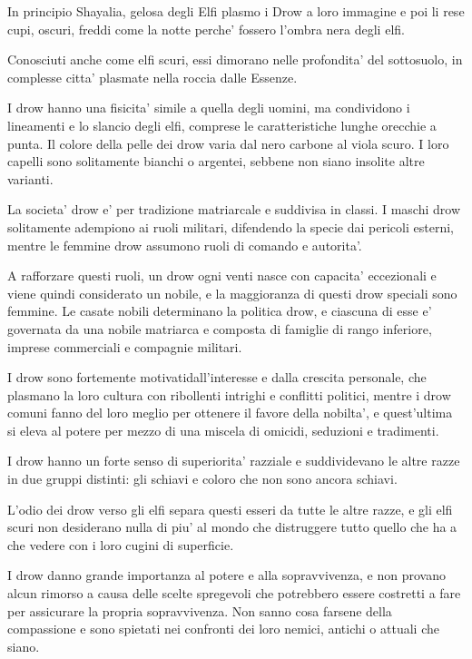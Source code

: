\documentclass[a4paper,11pt,twoside,openany]{dndbook}
\begin{document}
In principio Shayalia, gelosa degli Elfi plasmo i Drow a loro immagine e poi li rese cupi, oscuri, freddi come la notte perche' fossero l'ombra nera degli elfi.

Conosciuti anche come elfi scuri, essi dimorano nelle profondita' del sottosuolo, in complesse citta' plasmate nella roccia dalle Essenze.

I drow hanno una fisicita' simile a quella degli uomini, ma condividono i lineamenti e lo slancio degli elfi, comprese le caratteristiche lunghe orecchie a punta. Il colore della pelle dei drow varia dal nero carbone al viola scuro. I loro capelli sono solitamente bianchi o argentei, sebbene non siano insolite altre varianti.

La societa' drow e' per tradizione matriarcale e suddivisa in classi. I maschi drow solitamente adempiono ai ruoli militari, difendendo la specie dai pericoli esterni, mentre le femmine drow assumono ruoli di comando e autorita'.

A rafforzare questi ruoli, un drow ogni venti nasce con capacita' eccezionali e viene quindi considerato un nobile, e la maggioranza di questi drow speciali sono femmine. Le casate nobili determinano la politica drow, e ciascuna di esse e' governata da una nobile matriarca e composta di famiglie di rango inferiore, imprese commerciali e compagnie militari.

I drow sono fortemente motivatidall'interesse e dalla crescita personale, che plasmano la loro cultura con ribollenti intrighi e conflitti politici, mentre i drow comuni fanno del loro meglio per ottenere il favore della nobilta', e quest'ultima si eleva al potere per mezzo di una miscela di omicidi, seduzioni e tradimenti.

I drow hanno un forte senso di superiorita' razziale e suddividevano le altre razze in due gruppi distinti: gli schiavi e coloro che non sono ancora schiavi.

L'odio dei drow verso gli elfi separa questi esseri da tutte le altre razze, e gli elfi scuri non desiderano nulla di piu' al mondo che distruggere tutto quello che ha a che vedere con i loro cugini di superficie.

I drow danno grande importanza al potere e alla sopravvivenza, e non provano alcun rimorso a causa delle scelte spregevoli che potrebbero essere costretti a fare per assicurare la propria sopravvivenza. Non sanno cosa farsene della compassione e sono spietati nei confronti dei loro nemici, antichi o attuali che siano.
\end{document}
